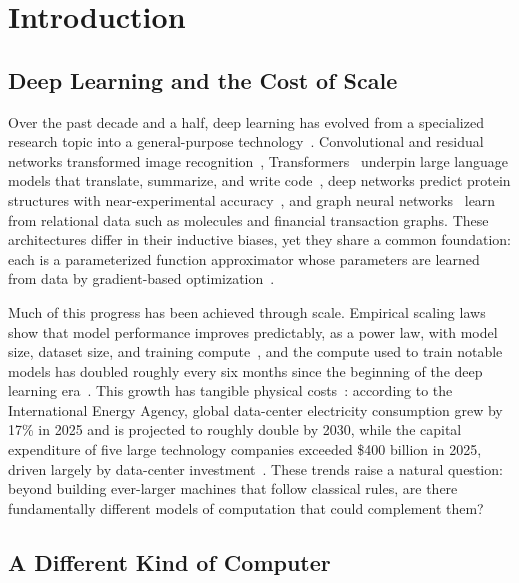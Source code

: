 \documentclass[12pt]{article}
\numberwithin{equation}{section}  %
\begin{document}
\section{Introduction}
\label{sec:introduction}

\subsection{Deep Learning and the Cost of Scale}
\label{sec:intro_scale}

Over the past decade and a half, deep learning has evolved from a specialized research topic into a general-purpose technology~\cite{lecun2015deep}. Convolutional and residual networks transformed image recognition~\cite{krizhevsky2012imagenet, he2016deep}, Transformers~\cite{vaswani2017attention} underpin large language models that translate, summarize, and write code~\cite{brown2020language}, deep networks predict protein structures with near-experimental accuracy~\cite{jumper2021highly}, and graph neural networks~\cite{scarselli2009graph} learn from relational data such as molecules and financial transaction graphs. These architectures differ in their inductive biases, yet they share a common foundation: each is a parameterized function approximator whose parameters are learned from data by gradient-based optimization~\cite{rumelhart1986learning, goodfellow2016deep}.

Much of this progress has been achieved through scale. Empirical scaling laws show that model performance improves predictably, as a power law, with model size, dataset size, and training compute~\cite{kaplan2020scaling}, and the compute used to train notable models has doubled roughly every six months since the beginning of the deep learning era~\cite{sevilla2022compute}. This growth has tangible physical costs~\cite{strubell2019energy}: according to the International Energy Agency, global data-center electricity consumption grew by 17\% in 2025 and is projected to roughly double by 2030, while the capital expenditure of five large technology companies exceeded \$400 billion in 2025, driven largely by data-center investment~\cite{iea2026keyquestions}. These trends raise a natural question: beyond building ever-larger machines that follow classical rules, are there fundamentally different models of computation that could complement them?

\subsection{A Different Kind of Computer}
\label{sec:intro_quantum}
\end{document}

